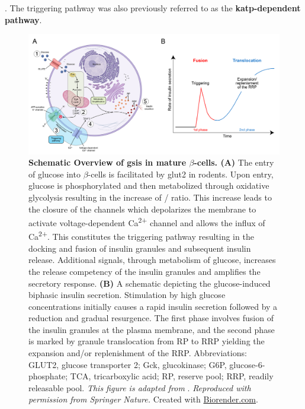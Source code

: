 \textbf{\cite{jewell_exocytosis_2010,chatterjee_bhowmick_conventional_2021}}.   %
The triggering pathway was also previously referred to as the \textbf{ \gls{katp}-dependent pathway}.\\

\begin{figure}[t]
    \centering
    \includegraphics[width=\linewidth]{Chapter1/Fig/F1-11-01.png}
    \caption[Glucose-stimulated insulin secretion in $\beta$-cells]{\textbf{Schematic Overview of \gls{gsis} in mature $\beta$-cells. (A)} The entry of glucose into $\beta$-cells is facilitated by \gls{glut}2 in rodents. Upon entry, glucose is phosphorylated and then metabolized through oxidative glycolysis resulting in the increase of  /  ratio. This increase leads to the closure of the  channels which depolarizes the membrane to activate voltage-dependent Ca\textsuperscript{2+} channel and allows the influx of Ca\textsuperscript{2+}. This constitutes the triggering pathway resulting in the docking and fusion of insulin granules and subsequent insulin release. Additional signals, through metabolism of glucose, increases the release competency of the insulin granules and amplifies the secretory response. \textbf{(B)} A schematic depicting the glucose-induced biphasic insulin secretion. Stimulation by high glucose concentrations initially causes a rapid insulin secretion followed by a reduction and gradual resurgence. The first phase involves fusion of the insulin granules at the plasma membrane, and the second phase is marked by granule translocation from RP to RRP yielding the expansion and/or replenishment of the RRP. Abbreviations: GLUT2, glucose transporter 2; Gck, glucokinase; G6P, glucose-6-phosphate; TCA, tricarboxylic acid; RP, reserve pool; RRP, readily releasable pool. \textit{This figure is adapted from }\textbf{\cite{campbell_mechanisms_2021,aizawa_rab27a_2005}}. \textit{Reproduced with permission from Springer Nature.} Created with \href{https://www.biorender.com/}{Biorender.com}.}  
    \label{fig:chp1_gsis}
\end{figure}




